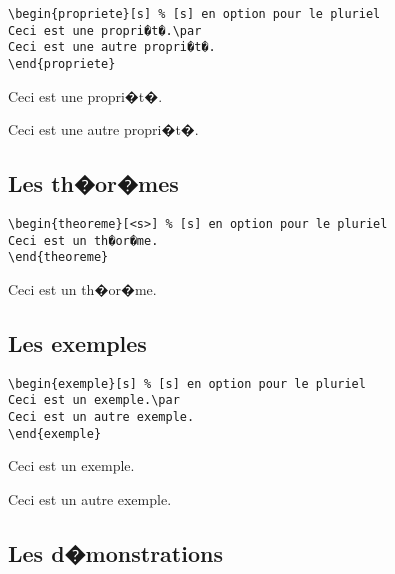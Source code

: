 \documentclass[ams,openany,10pt,presentation,latin1]{mathbook}
\begin{document}
\begin{lstlisting}
\begin{propriete}[s] % [s] en option pour le pluriel
Ceci est une propri�t�.\par
Ceci est une autre propri�t�.
\end{propriete}
\end{lstlisting}

\begin{propriete}[s]
Ceci est une propri�t�.\par
Ceci est une autre propri�t�.
\end{propriete}

\newpage

\subsection{Les th�or�mes}

\begin{lstlisting}
\begin{theoreme}[<s>] % [s] en option pour le pluriel
Ceci est un th�or�me.
\end{theoreme}
\end{lstlisting}

\begin{theoreme}
Ceci est un th�or�me.
\end{theoreme}

\subsection{Les exemples}

\begin{lstlisting}
\begin{exemple}[s] % [s] en option pour le pluriel
Ceci est un exemple.\par
Ceci est un autre exemple.
\end{exemple}
\end{lstlisting}

\begin{exemple}[s]
Ceci est un exemple.\par
Ceci est un autre exemple.
\end{exemple}

\subsection{Les d�monstrations}
\end{document}
